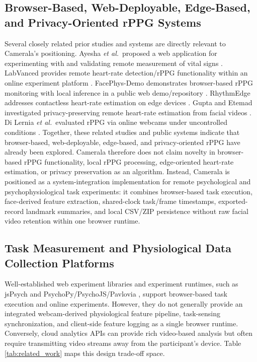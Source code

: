 \documentclass[dvipdfmx]{ehis}
\newcommand{\etal}{\textit{et al.}}
\begin{document}
\subsection{Browser-Based, Web-Deployable, Edge-Based, and Privacy-Oriented rPPG Systems}
Several closely related prior studies and systems are directly relevant to Camerala's positioning.
Ayesha \etal\ proposed a web application for experimenting with and validating remote measurement of vital signs \cite{ayesha_web_vital}.
LabVanced provides remote heart-rate detection/rPPG functionality within an online experiment platform \cite{labvanced_rppg}.
FacePhys-Demo demonstrates browser-based rPPG monitoring with local inference in a public web demo/repository \cite{facephys_demo}.
RhythmEdge addresses contactless heart-rate estimation on edge devices \cite{rhythmedge}.
Gupta and Etemad investigated privacy-preserving remote heart-rate estimation from facial videos \cite{gupta_privacy}.
Di Lernia \etal\ evaluated rPPG via online webcams under uncontrolled conditions \cite{di_lernia_rppg_wild}.
Together, these related studies and public systems indicate that browser-based, web-deployable, edge-based, and privacy-oriented rPPG have already been explored.
Camerala therefore does not claim novelty in browser-based rPPG functionality, local rPPG processing, edge-oriented heart-rate estimation, or privacy preservation as an algorithm.
Instead, Camerala is positioned as a system-integration implementation for remote psychological and psychophysiological task experiments: it combines browser-based task execution, face-derived feature extraction, shared-clock task/frame timestamps, exported-record landmark summaries, and local CSV/ZIP persistence without raw facial video retention within one browser runtime.

\subsection{Task Measurement and Physiological Data Collection Platforms}
Well-established web experiment libraries and experiment runtimes, such as jsPsych \cite{jspsych_joss} and PsychoPy/PsychoJS/Pavlovia \cite{psychopy2}, support browser-based task execution and online experiments.
However, they do not generally provide an integrated webcam-derived physiological feature pipeline, task-sensing synchronization, and client-side feature logging as a single browser runtime.
Conversely, cloud analytics APIs can provide rich video-based analysis but often require transmitting video streams away from the participant's device.
Table \ref{tab:related_work} maps this design trade-off space.
\end{document}
